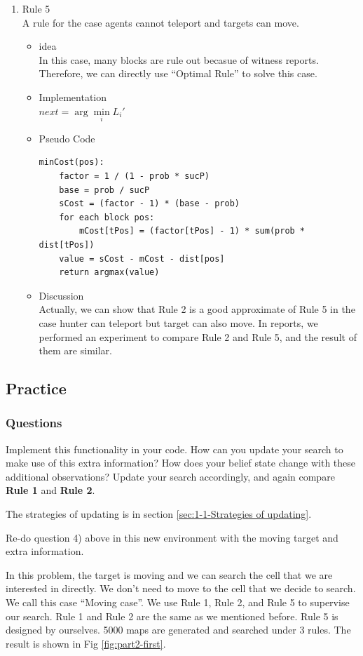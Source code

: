 \documentclass[letter]{article}
\begin{document}
\begin{enumerate}
	\item {Rule 5} \\
	A rule for the case agents cannot teleport and targets can move.
	\begin{itemize}
		\item {idea} \\
		In this case, many blocks are rule out becasue of witness reports. Therefore, we can directly use ``Optimal Rule'' to solve this case.
		\item {Implementation} \\
		$next = \arg\min\limits_i L_i'$
		\item {Pseudo Code} 
		\begin{lstlisting}
minCost(pos):
	factor = 1 / (1 - prob * sucP)
	base = prob / sucP
	sCost = (factor - 1) * (base - prob)
	for each block pos:
		mCost[tPos] = (factor[tPos] - 1) * sum(prob * dist[tPos])
	value = sCost - mCost - dist[pos]
	return argmax(value)  
		\end{lstlisting}
		\item {Discussion} \\
		Actually, we can show that Rule 2 is a good approximate of Rule 5 in the case hunter can teleport but target can also move. In reports, we performed an experiment to compare Rule 2 and Rule 5, and the result of them are similar.
	\end{itemize}
\end{enumerate}
	
\subsection{Practice}
\label{2-2practice}
\subsubsection{Questions}
\label{2-2-1questions}
\par{Implement this functionality in your code. How can you update your search to make use of this extra information?
	How does your belief state change with these additional observations? Update your search accordingly, and again
	compare \textbf{Rule 1} and \textbf{Rule 2}.}

	The strategies of updating is in section \ref{sec:1-1-Strategies of updating}.

\par{Re-do question 4) above in this new environment with the moving target and extra information.}

	In this problem, the target is moving and we can search the cell that we are interested in directly. We don’t need to move to the cell that we decide to search. We call this case ``Moving case''. We use Rule 1, Rule 2, and Rule 5 to supervise our search. Rule 1 and Rule 2 are the same as we mentioned before. Rule 5 is designed by ourselves. 5000
	maps are generated and searched under 3 rules. The result is shown in Fig \ref{fig:part2-first}.
	
\end{document}
